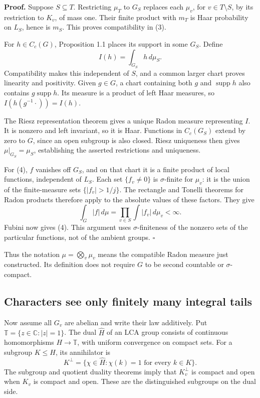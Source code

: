 \documentclass[
  english,
  11pt,
  a4paper,
]{article}
\begin{document}
\textbf{Proof.} Suppose \(S\subseteq T\). Restricting \(\mu_T\) to
\(G_S\) replaces each \(\mu_v\), for \(v\in T\setminus S\), by its
restriction to \(K_v\), of mass one. Their finite product with \(m_T\)
is Haar probability on \(L_S\), hence is \(m_S\). This proves
compatibility in (3).

For \(h\in C_c(G)\), Proposition 1.1 places its support in some \(G_S\).
Define \[I(h)=\int_{G_S}h\,d\mu_S.\] Compatibility makes this
independent of \(S\), and a common larger chart proves linearity and
positivity. Given \(g\in G\), a chart containing both \(g\) and
\(\operatorname{supp}h\) also contains \(g\operatorname{supp}h\). Its
measure is a product of left Haar measures, so
\(I(h(g^{-1}\cdot))=I(h)\).

The Riesz representation theorem gives a unique Radon measure
representing \(I\). It is nonzero and left invariant, so it is Haar.
Functions in \(C_c(G_S)\) extend by zero to \(G\), since an open
subgroup is also closed. Riesz uniqueness then gives
\(\mu|_{G_S}=\mu_S\), establishing the asserted restrictions and
uniqueness.

For (4), \(f\) vanishes off \(G_S\), and on that chart it is a finite
product of local functions, independent of \(L_S\). Each set
\(\{f_v\neq0\}\) is \(\sigma\)-finite for \(\mu_v\): it is the union of
the finite-measure sets \(\{|f_v|>1/j\}\). The rectangle and Tonelli
theorems for Radon products therefore apply to the absolute values of
these factors. They give
\[\int_G|f|\,d\mu=\prod_{v\in S}\int|f_v|\,d\mu_v<\infty.\] Fubini now
gives (4). This argument uses \(\sigma\)-finiteness of the nonzero sets
of the particular functions, not of the ambient groups. \(\square\)

Thus the notation \(\mu=\bigotimes_v\mu_v\) means the compatible Radon
measure just constructed. Its definition does not require \(G\) to be
second countable or \(\sigma\)-compact.

\subsection{Characters see only finitely many integral
tails}\label{NT-ADL-01--characters-see-only-finitely-many-integral-tails}

Now assume all \(G_v\) are abelian and write their law additively. Put
\(\mathbb T=\{z\in\mathbb C:|z|=1\}\). The dual \(\widehat H\) of an LCA
group consists of continuous homomorphisms \(H\to\mathbb T\), with
uniform convergence on compact sets. For a subgroup \(K\leq H\), its
annihilator is
\[K^\perp=\{\chi\in\widehat H:\chi(k)=1\text{ for every }k\in K\}.\] The
subgroup and quotient duality theorems imply that \(K_v^\perp\) is
compact and open when \(K_v\) is compact and open. These are the
distinguished subgroups on the dual side.
\end{document}
